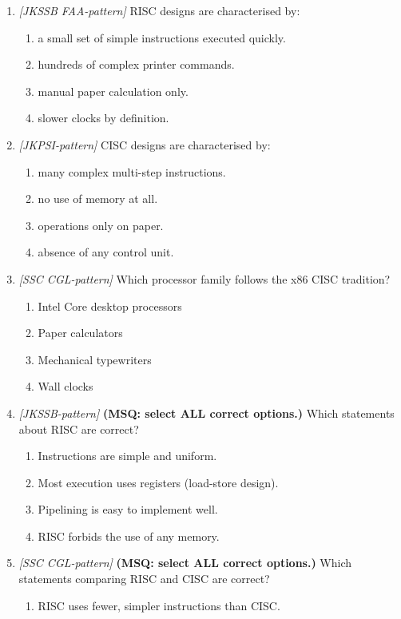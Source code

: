 \begin{enumerate}[label=\textbf{Q\arabic*.}, leftmargin=*]
\item \textit{[JKSSB FAA-pattern]} RISC designs are characterised by:
  \begin{enumerate}[label=\Alph*.]
    \item a small set of simple instructions executed quickly.
    \item hundreds of complex printer commands.
    \item manual paper calculation only.
    \item slower clocks by definition.
  \end{enumerate}
\item \textit{[JKPSI-pattern]} CISC designs are characterised by:
  \begin{enumerate}[label=\Alph*.]
    \item many complex multi-step instructions.
    \item no use of memory at all.
    \item operations only on paper.
    \item absence of any control unit.
  \end{enumerate}
\item \textit{[SSC CGL-pattern]} Which processor family follows the x86 CISC tradition?
  \begin{enumerate}[label=\Alph*.]
    \item Intel Core desktop processors
    \item Paper calculators
    \item Mechanical typewriters
    \item Wall clocks
  \end{enumerate}
\item \textit{[JKSSB-pattern]} \textbf{(MSQ: select ALL correct options.)} Which statements about RISC are correct?
  \begin{enumerate}[label=\Alph*.]
    \item Instructions are simple and uniform.
    \item Most execution uses registers (load-store design).
    \item Pipelining is easy to implement well.
    \item RISC forbids the use of any memory.
  \end{enumerate}
\item \textit{[SSC CGL-pattern]} \textbf{(MSQ: select ALL correct options.)} Which statements comparing RISC and CISC are correct?
  \begin{enumerate}[label=\Alph*.]
    \item RISC uses fewer, simpler instructions than CISC.

\end{enumerate}
\end{enumerate}
